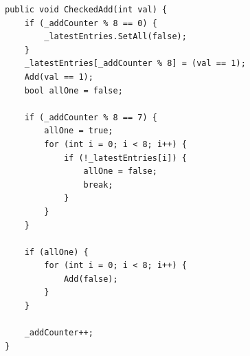 \begin{lstlisting}[firstnumber=26,label=lst:newCheckedAdd, caption={Improved \lstinline|CheckedAdd| in \lstinline|BitList|. The for-loop only runs an eighth of the time. \textbf{File:} first\textunderscore  round/BitList.cs.}]
public void CheckedAdd(int val) {
    if (_addCounter % 8 == 0) {
        _latestEntries.SetAll(false);
    }
    _latestEntries[_addCounter % 8] = (val == 1);
    Add(val == 1);
    bool allOne = false;

    if (_addCounter % 8 == 7) {
        allOne = true;
        for (int i = 0; i < 8; i++) {
            if (!_latestEntries[i]) {
                allOne = false;
                break;
            }
        }
    }

    if (allOne) {
        for (int i = 0; i < 8; i++) {
            Add(false);
        }
    }

    _addCounter++;
}
\end{lstlisting}

